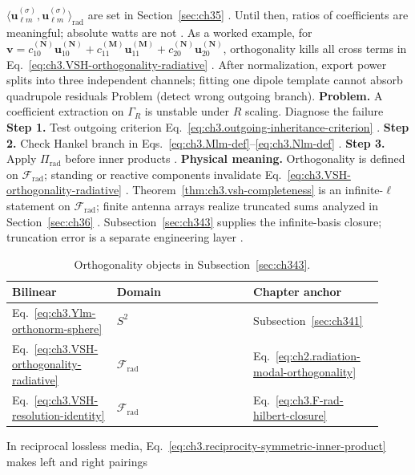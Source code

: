 \(\langle\mathbf{u}_{\ell m}^{(\sigma)},\mathbf{u}_{\ell m}^{(\sigma)}\rangle_{\mathrm{rad}}\) are set in
Section~\ref{sec:ch35} . Until then, ratios of coefficients are meaningful; absolute
watts are not .
As a worked example, for \(\mathbf{v}=c_{10}^{(\mathbf{N})}\mathbf{u}_{10}^{(\mathbf{N})}+c_{11}^{(\mathbf{M})}\mathbf{u}_{11}^{(\mathbf{M})}
+c_{20}^{(\mathbf{N})}\mathbf{u}_{20}^{(\mathbf{N})}\), orthogonality kills all cross terms in
Eq.~\eqref{eq:ch3.VSH-orthogonality-radiative} . After normalization, export power splits
into three independent channels; fitting one dipole template cannot absorb quadrupole residuals
Problem (detect wrong outgoing branch). \textbf{Problem.} A coefficient extraction on \(\Gamma_R\) is unstable under \(R\) scaling. Diagnose the failure
\textbf{Step 1.} Test outgoing criterion Eq.~\eqref{eq:ch3.outgoing-inheritance-criterion} .
\textbf{Step 2.} Check Hankel branch in Eqs.~\eqref{eq:ch3.Mlm-def}--\eqref{eq:ch3.Nlm-def} .
\textbf{Step 3.} Apply \(\Pi_{\mathrm{rad}}\) before inner products .
\textbf{Physical meaning.} Orthogonality is defined on \(\mathcal{F}_{\mathrm{rad}}\); standing or reactive components
invalidate Eq.~\eqref{eq:ch3.VSH-orthogonality-radiative} .
Theorem~\ref{thm:ch3.vsh-completeness} is an infinite-\(\ell\) statement on \(\mathcal{F}_{\mathrm{rad}}\); finite
antenna arrays realize truncated sums analyzed in Section~\ref{sec:ch36} . Subsection~\ref{sec:ch343}
supplies the infinite-basis closure; truncation error is a separate engineering layer .
\begin{table}[t]
\centering
\caption{Orthogonality objects in Subsection~\ref{sec:ch343}.}
\label{tab:ch3.343-orthogonality-objects}
\small
\begin{tabular}{@{}p{0.26\linewidth}p{0.34\linewidth}p{0.32\linewidth}@{}}
\toprule
Bilinear & Domain & Chapter anchor \\
\midrule
Eq.~\eqref{eq:ch3.Ylm-orthonorm-sphere} & \(S^{2}\) & Subsection~\ref{sec:ch341} \\
Eq.~\eqref{eq:ch3.VSH-orthogonality-radiative} & \(\mathcal{F}_{\mathrm{rad}}\) & Eq.~\eqref{eq:ch2.radiation-modal-orthogonality} \\
Eq.~\eqref{eq:ch3.VSH-resolution-identity} & \(\mathcal{F}_{\mathrm{rad}}\) & Eq.~\eqref{eq:ch3.F-rad-hilbert-closure} \\
\bottomrule
\end{tabular}
\end{table}
In reciprocal lossless media, Eq.~\eqref{eq:ch3.reciprocity-symmetric-inner-product} makes left and right pairings
